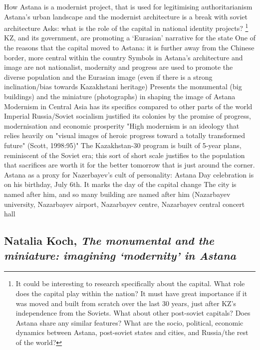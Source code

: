 \documentclass{article}
\begin{document}
\begin{outline}
	\1 How Astana is a modernist project, that is used for legitimising authoritarianism
	\1 Astana's urban landscape and the modernist architecture is a break with soviet architecture
	\1 Asks: what is the role of the capital in national identity projects? \footnote{It could be interesting to research specifically about the capital. What role does the capital play within the nation? It must have great importance if it was moved and built from scratch over the last 30 years, just after KZ's independence from the Soviets. What about other post-soviet capitals? Does Astana share any similar features? What are the socio, political, economic dynamics between Astana, post-soviet states and cities, and Russia/the rest of the world?}
	\1 KZ, and its government, are promoting a `Eurasian' narrative for the state
		\2 One of the reasons that the capital moved to Astana: it is further away from the Chinese border, more central within the country
		\2 Symbols in Astana's architecture and image are not nationalist, modernity and progress are used to promote the diverse population and the Eurasian image (even if there is a strong inclination/bias towards Kazakhstani heritage)
	\1 Presents the monumental (big buildings) and the miniature (photographs) in shaping the image of Astana
	\1 Modernism in Central Asia has its specifics compared to other parts of the world
		\2 Imperial Russia/Soviet socialism justified its colonies by the promise of progress, modernisation and economic prosperity
	\1 "High modernism is an ideology that relies heavily on "visual images of heroic progress toward a totally transformed future" (Scott, 1998:95)"
	\1 The Kazakhstan-30 program is built of 5-year plans, reminiscent of the Soviet era; this sort of short scale justifies to the population that sacrifices are worth it for the better tomorrow that is just around the corner.
	\1 Astana as a proxy for Nazerbayev's cult of personality:
		\2 Astana Day celebration is on his birthday, July 6th. It marks the day of the capital change
		\2 The city is named after him, and so many building are named after him (Nazarbayev university, Nazarbayev airport, Nazarbayev centre, Nazarbayev central concert hall
\end{outline}

\subsection{Natalia Koch, \textit{The monumental and the miniature: imagining `modernity' in Astana}}\cite{koch2010monumental}
\end{document}
